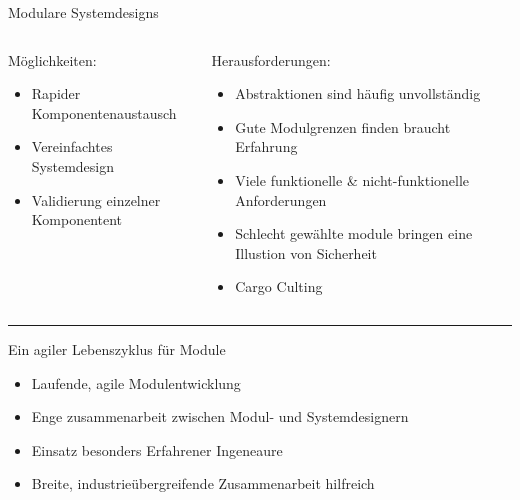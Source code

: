 
\begin{frame}{Modulare Systemdesigns}
  \begin{columns}[t,fullwidth]
    \begin{column}{.3\linewidth}
      Möglichkeiten:
      \tiny
      \vspace{0.5em}
      \begin{itemize}
        \item Rapider Komponentenaustausch
        \item Vereinfachtes Systemdesign
        \item Validierung einzelner Komponentent
      \end{itemize}
    \end{column}

    \vrule

    \begin{column}{.65\linewidth}
      Herausforderungen:
      \tiny
      \vspace{0.5em}
      \begin{itemize}
        \item Abstraktionen sind häufig unvollständig
        \item Gute Modulgrenzen finden braucht Erfahrung
        \item Viele funktionelle \& nicht-funktionelle Anforderungen
        \item Schlecht gewählte module bringen eine Illustion von Sicherheit
        \item Cargo Culting
      \end{itemize}
    \end{column}

  \end{columns}

  \hrule

  Ein agiler Lebenszyklus für Module

    \tiny
  \begin{itemize}
    \item Laufende, agile Modulentwicklung
    \item Enge zusammenarbeit zwischen Modul- und Systemdesignern
    \item Einsatz besonders Erfahrener Ingeneaure
    \item Breite, industrieübergreifende Zusammenarbeit hilfreich
  \end{itemize}

\end{frame}


